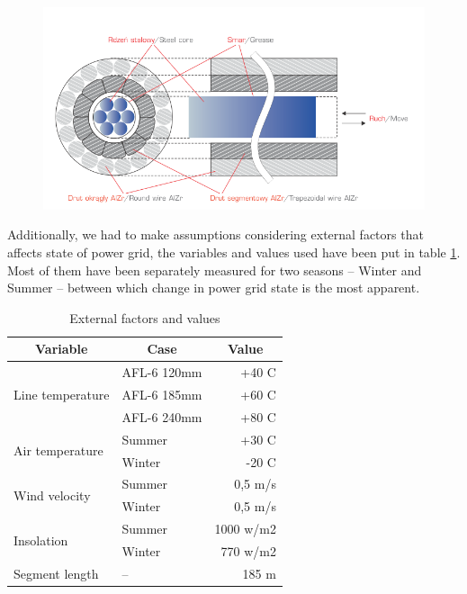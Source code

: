 \documentclass[a4paper]{article}
\begin{document}
\begin{figure}[h]
\centering
\includegraphics[scale=0.45]{schemas/img2.png}
\caption{\label{fig:img2}}
\end{figure}

Additionally, we had to make assumptions considering external factors that affects state of power grid, the variables and values used have been put in table \ref{tab:extProperties}. Most of them have been separately measured for two seasons -- Winter and Summer -- between which change in power grid state is the most apparent.\\

\begin{table}[!h]
\centering
\caption{External factors and values}
\label{tab:extProperties}
\begin{tabular}{|l|l|r|}
\hline
\multicolumn{1}{|c|}{Variable}    & \multicolumn{1}{c|}{Case} & \multicolumn{1}{c|}{Value} \\ \hline
\multirow{3}{*}{Line temperature} & AFL-6  120mm              & +40 C                      \\ \cline{2-3} 
                                  & AFL-6 185mm               & +60 C                      \\ \cline{2-3} 
                                  & AFL-6 240mm               & +80 C                      \\ \hline
\multirow{2}{*}{Air temperature}  & Summer                    & +30 C                      \\ \cline{2-3} 
                                  & Winter                    & -20 C                      \\ \hline
\multirow{2}{*}{Wind velocity}    & Summer                    & 0,5 m/s                    \\ \cline{2-3} 
                                  & Winter                    & 0,5 m/s                    \\ \hline
\multirow{2}{*}{Insolation}       & Summer                    & 1000 w/m2                  \\ \cline{2-3} 
                                  & Winter                    & 770 w/m2                   \\ \hline
Segment length                    & --                        & 185 m                      \\ \hline
\end{tabular}
\end{table}
\end{document}
